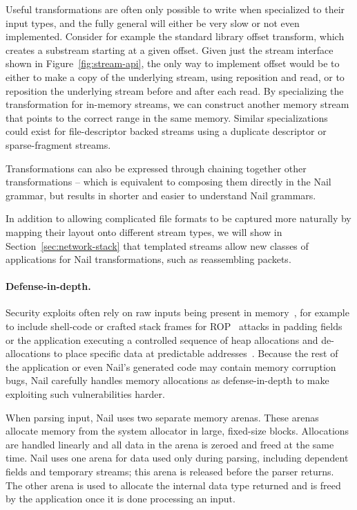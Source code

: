 Useful transformations are often only possible to write when specialized to their input types, and the fully general will either be very slow or not even implemented. Consider for example the standard library offset transform, which creates a substream starting at a given offset. Given just the stream interface shown in Figure~\ref{fig:stream-api}, the only way to implement offset would be to either to make a copy of the underlying stream, using reposition and read, or to reposition the underlying stream before and after each read. By specializing the transformation for in-memory streams, we can construct another memory stream that points to the correct range in the same memory. Similar specializations could exist for file-descriptor backed streams using a duplicate descriptor or sparse-fragment streams.


Transformations can also be expressed through chaining together other transformations -- which is equivalent to composing them directly in the Nail grammar, but results in shorter and easier to understand Nail grammars.

In addition to allowing complicated file formats to be captured more naturally by mapping their layout onto different stream types, we will show in Section~\ref{sec:network-stack} that templated streams allow new classes of applications for Nail transformations, such as reassembling packets.

\paragraph{Defense-in-depth.}

Security exploits often rely on raw inputs being present in memory~\cite{shotgun-parser}, for example to include
shell-code or crafted stack frames for ROP~\cite{phrack58:4-nergal} attacks in padding fields or the
application executing a controlled sequence of heap allocations and de-allocations to place
specific data at predictable addresses~\cite{jp-advanced, vudo-malloc}. Because the rest of the
application or even Nail's generated code may contain memory corruption bugs, Nail
carefully handles memory allocations as defense-in-depth to make exploiting such vulnerabilities harder.

When parsing input, Nail uses two separate memory arenas. These arenas allocate memory from the
system allocator in large, fixed-size blocks. Allocations are handled linearly and all data in the
arena is zeroed and freed at the same time. Nail uses one arena for data used only during parsing,
including dependent fields and temporary streams; this arena is released before the parser returns.
The other arena is used to allocate the internal data type returned and is freed by the application
once it is done processing an input. 

